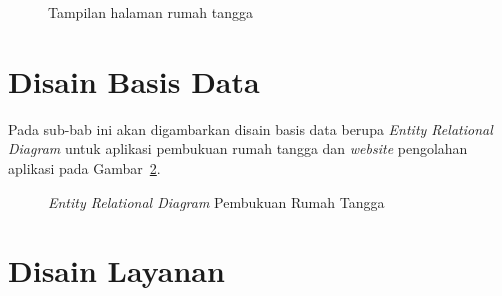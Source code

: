 \begin{figure}
\centering
{}
\caption[Tampilan halaman rumah tangga]{Tampilan halaman rumah tangga} 
\label{fig:design_web_index_rumah_tangga}
\end{figure}

\section{Disain Basis Data}
\label{sec:disainbasisdata}

Pada sub-bab ini akan digambarkan disain basis data berupa \textit{Entity Relational Diagram} untuk aplikasi pembukuan rumah tangga dan \textit{website} pengolahan aplikasi pada Gambar~\ref{fig:er_diagram_prt}.

\begin{figure}[h]
\centering
{}
\caption[\textit{Entity Relational Diagram} Pembukuan Rumah Tangga]{\textit{Entity Relational Diagram} Pembukuan Rumah Tangga} 
\label{fig:er_diagram_prt}
\end{figure}

\section{Disain Layanan}
\label{sec:disainlayanan}



